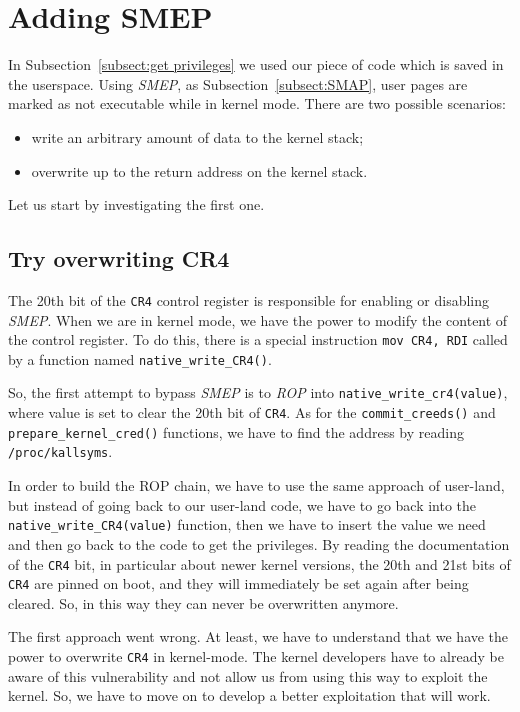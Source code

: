 \documentclass{masterthesis}
\newcommand{\refToSubSection}[1]{Subsection~\ref{subsect:#1}\xspace}
\begin{document}
\section{Adding SMEP}
\label{sect:addSmep}
In \refToSubSection{get privileges} we used our piece of code which is saved in the userspace. Using \emph{SMEP}, as \refToSubSection{SMAP}, user pages are marked as not executable while in kernel mode.
There are two possible scenarios:
\begin{itemize}
\item write an arbitrary amount of data to the kernel stack;
\item overwrite up to the return address on the kernel stack.
\end{itemize}
Let us start by investigating the first one.
\subsection{Try overwriting CR4}
\label{subsect:CR4}
The 20th bit of the \texttt{CR4} control register is responsible for enabling or disabling \emph{SMEP}.
When we are in kernel mode, we have the power to modify the content of the control register.
To do this, there is a special instruction \lstinline{mov CR4, RDI} called by a function named \texttt{native\_write\_CR4()}.

So, the first attempt to bypass \emph{SMEP} is to \emph{ROP} into \texttt{native\_write\_cr4(value)}, where value is set to clear the 20th bit of \texttt{CR4}.
As for the \texttt{commit\_creeds()} and \\\texttt{prepare\_kernel\_cred()} functions, we have to find the address by reading \lstinline{/proc/kallsyms}.

In order to build the ROP chain, we have to use the same approach of user-land, but instead of going back to our user-land code, we have to go back into the \texttt{native\_write\_CR4(value)} function, then we have to insert the value we need and then go back to the code to get the privileges.
By reading the documentation of the \texttt{CR4} bit, in particular about newer kernel versions, the 20th and 21st bits of \texttt{CR4} are pinned on boot, and they will immediately be set again after being cleared. So, in this way they can never be overwritten anymore.

The first approach went wrong. At least, we have to understand that we have the power to overwrite \texttt{CR4} in kernel-mode. The kernel developers have to already be aware of this vulnerability and not allow us from using this way to exploit the kernel. So, we have to move on to develop a better exploitation that will work.
\end{document}
